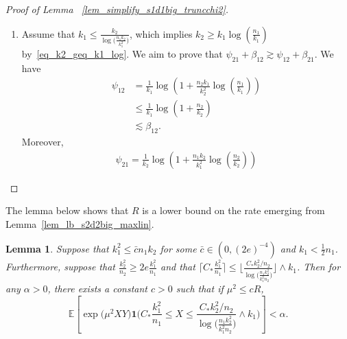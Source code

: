 \documentclass{article}
\newcommand{\EE}{\mathbb{E}}
\newcommand{\one}{\mathbf{1}}
\newcommand{\Ct}{C_{*}}
\newtheorem{lemma}{Lemma}
\begin{document}
\begin{proof}[Proof of Lemma ~\ref{lem_simplify_s1d1big_truncchi2}]
\begin{enumerate}
\begin{align*}
    &\geq \frac{1}{2}(\psi_{21} + \beta_{12}) \land \phi_{12} \land \phi_{21}.
\end{align*}
This concludes the proof of equation~\eqref{eq_lower_bounn_M}.
\item Assume that $k_1 \leq \frac{k_2}{\log\big(\frac{n_1k_2}{k_1^2}\big)}$, which implies $k_2 \geq k_1 \log\left(\frac{n_1}{k_1}\right)$ by~\eqref{eq_k2_geq_k1_log}. We aim to prove that $\psi_{21} + \beta_{12} \gtrsim \psi_{12} + \beta_{21}$. We have
\begin{align*}
    \psi_{12} &= \frac{1}{k_1} \log\left(1+ \frac{n_2k_1}{k_2^2} \log\left(\frac{n_1}{k_1}\right)\right)\\
    & \leq \frac{1}{k_1} \log\left(1+\frac{n_2}{k_2}\right)\\
    & \lesssim \beta_{12}.
\end{align*}
Moreover, 
\begin{align*}
    \psi_{21} = \frac{1}{k_2} \log\left(1+ \frac{n_1k_2}{k_1^2} \log\left(\frac{n_2}{k_2}\right)\right)
\end{align*}
    \end{enumerate}
\end{proof}


The lemma below shows that $R$ is a lower bound on the rate emerging from Lemma~\ref{lem_lb_s2d2big_maxlin}.

\begin{lemma}\label{lem_simplify_s2d2big_maxlin}
    Suppose that $k_1^2 \leq \bar{c}n_1k_2$ for some $\bar{c} \in (0, (2e)^{-4})$ and $k_1 < \frac12 n_1$. 
    Furthermore, suppose that $\frac{k^2_2}{n_2} \geq 2e\frac{k_1^2}{n_1}$ and that $\lceil \Ct \frac{k_1^2}{n_1}\rceil \leq \Big\lfloor \frac{\Ct k_2^2/n_2}{\log\big(\frac{n_1k_2^2}{k_1^2n_2}\big)}\Big\rfloor\wedge k_1$. Then for any $\alpha > 0$, there exists a constant $c > 0$ such that if $\mu^2 \leq cR$, 
    \[\EE\left[\exp\big(\mu^2XY\big)\one\bigg(\Ct \frac{k_1^2}{n_1}  \leq X \leq  \frac{\Ct k_2^2/n_2}{\log\big(\frac{n_1k_2^2}{k_1^2n_2}\big)}\wedge k_1\bigg)\right] < \alpha.\]
\end{lemma}
\end{document}
